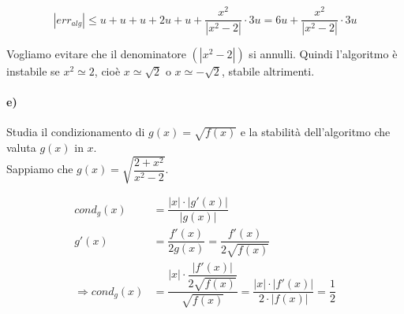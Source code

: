\begin{equation*}
|err_{alg}| \leq u+u+u+2u+u+\dfrac{x^2}{|x^2-2|}\cdot 3u = 6u + \dfrac{x^2}{|x^2-2|}\cdot 3u
\end{equation*}

Vogliamo evitare che il denominatore $(|x^2-2|)$ si annulli. Quindi l'algoritmo è instabile se $x^2\simeq 2$, cioè $x\simeq \sqrt{2}$ o $x\simeq -\sqrt{2}$, stabile altrimenti.


\paragraph{e)} Studia il condizionamento di $g(x)=\sqrt{f(x)}$ e la stabilità dell'algoritmo che valuta $g(x)$ in $x$.\\

Sappiamo che $g(x)=\sqrt{\dfrac{2+x^2}{x^2-2}}$.

\begin{center}
\end{center}

\begin{equation*}
\begin{split}
  cond_g(x) &= \dfrac{|x|\cdot|g'(x)|}{|g(x)|}\\[1.5ex]
  g'(x) &= \dfrac{f'(x)}{2g(x)} = \dfrac{f'(x)}{2\sqrt{f(x)}}\\[1.5ex]
  \Rightarrow cond_g(x) &= \dfrac{|x|\cdot \dfrac{|f'(x)|}{2\sqrt{f(x)}}}{\sqrt{f(x)}} = \dfrac{|x|\cdot |f'(x)|}{2\cdot |f(x)|} = \dfrac{1}{2}
\end{split}
\end{equation*}

